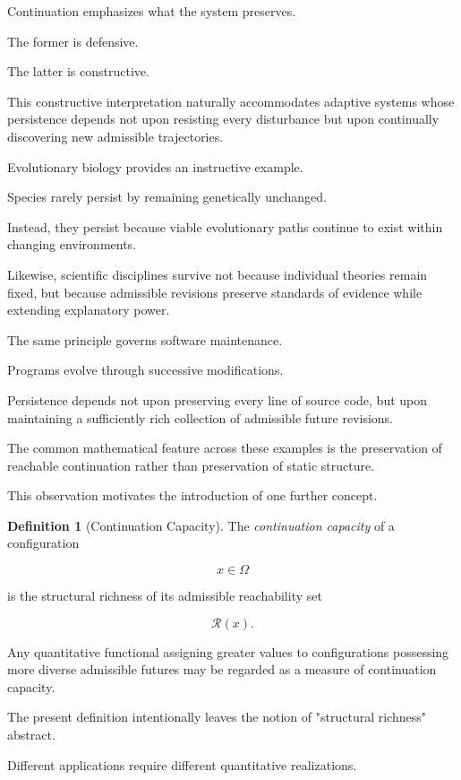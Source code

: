 \documentclass[11pt]{book}
\numberwithin{equation}{chapter}
\theoremstyle{definition}
\newtheorem{definition}{Definition}[chapter]
\theoremstyle{plain}
\begin{document}
Continuation emphasizes what the system preserves.

The former is defensive.

The latter is constructive.

This constructive interpretation naturally accommodates adaptive systems whose persistence depends not upon resisting every disturbance but upon continually discovering new admissible trajectories.

Evolutionary biology provides an instructive example.

Species rarely persist by remaining genetically unchanged.

Instead, they persist because viable evolutionary paths continue to exist within changing environments.

Likewise, scientific disciplines survive not because individual theories remain fixed, but because admissible revisions preserve standards of evidence while extending explanatory power.

The same principle governs software maintenance.

Programs evolve through successive modifications.

Persistence depends not upon preserving every line of source code, but upon maintaining a sufficiently rich collection of admissible future revisions.

The common mathematical feature across these examples is the preservation of reachable continuation rather than preservation of static structure.

This observation motivates the introduction of one further concept.

\begin{definition}[Continuation Capacity]

The \emph{continuation capacity} of a configuration

\[
x\in\Omega
\]

is the structural richness of its admissible reachability set

\[
\mathcal{R}(x).
\]

Any quantitative functional assigning greater values to configurations possessing more diverse admissible futures may be regarded as a measure of continuation capacity.

\end{definition}

The present definition intentionally leaves the notion of "structural richness" abstract.

Different applications require different quantitative realizations.
\end{document}
